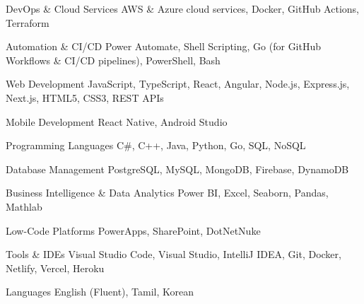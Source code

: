 
\begin{cvskills}

  \cvskill
    {DevOps \& Cloud Services} %
    {AWS \& Azure cloud services, Docker, GitHub Actions, Terraform} %

  \cvskill
    {Automation \& CI/CD} %
    {Power Automate, Shell Scripting, Go (for GitHub Workflows \& CI/CD pipelines), PowerShell, Bash} %

  \cvskill
    {Web Development} %
    {JavaScript, TypeScript, React, Angular, Node.js, Express.js, Next.js, HTML5, CSS3, REST APIs} %

  \cvskill
    {Mobile Development} %
    {React Native, Android Studio} %

  \cvskill
    {Programming Languages} %
    {C\#, C++, Java, Python, Go, SQL, NoSQL} %

  \cvskill
    {Database Management} %
    {PostgreSQL, MySQL, MongoDB, Firebase, DynamoDB} %

  \cvskill
    {Business Intelligence \& Data Analytics} %
    {Power BI, Excel, Seaborn, Pandas, Mathlab} %

  \cvskill
    {Low-Code Platforms} %
    {PowerApps, SharePoint, DotNetNuke} %

  \cvskill
    {Tools \& IDEs} %
    {Visual Studio Code, Visual Studio, IntelliJ IDEA, Git, Docker, Netlify, Vercel, Heroku} %

  \cvskill
    {Languages} %
    {English (Fluent), Tamil, Korean} %

\end{cvskills}
